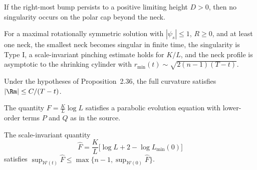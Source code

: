 \begin{lemma}
\label{ch02-lem-neckpinch-no-polar-singularity}

If the right-most bump persists to a positive limiting height \(D>0\), then no
singularity occurs on the polar cap beyond the neck.
\end{lemma}

\begin{proposition}
\label{ch02-prop-neckpinch-typei-cylinder}

For a maximal rotationally symmetric solution with \(|\psi_s|\le 1\), \(R\ge 0\),
and at least one neck, the smallest neck becomes singular in finite time, the
singularity is Type I, a scale-invariant pinching estimate holds for \(K/L\),
and the neck profile is asymptotic to the shrinking cylinder with
\(r_{\min}(t)\sim \sqrt{2(n-1)(T-t)}\).
\end{proposition}

\begin{lemma}
\label{ch02-lem-neckpinch-typei-bound}

Under the hypotheses of Proposition~2.36, the full curvature satisfies
\(|\Rm|\le C/(T-t)\).
\end{lemma}

\begin{lemma}
\label{ch02-lem-neckpinch-F-evolution}

The quantity \(F=\frac{K}{L}\log L\) satisfies a parabolic evolution equation
with lower-order terms \(P\) and \(Q\) as in the source.
\end{lemma}

\begin{lemma}
\label{ch02-lem-neckpinch-Fhat-bound}

The scale-invariant quantity
\[
\hat F=\frac{K}{L}\bigl[\log L+2-\log L_{\min}(0)\bigr]
\]
satisfies \(\sup_{\mathcal W(t)}\hat F\le \max\{n-1,\sup_{\mathcal W(0)}\hat F\}\).
\end{lemma}

